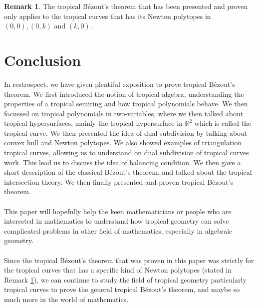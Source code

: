 \documentclass[]{article}
\theoremstyle{definition}
\numberwithin{equation}{section}
\newtheorem{rmk}[thm]{Remark}
\renewcommand{\.}{\,.}
\begin{document}
\begin{rmk} \label{fast}The tropical B\'ezout's theorem that has been presented and proven only applies to the tropical curves that has its Newton polytopes in $(0,0), (0,k)$ and $(k,0)$.\end{rmk}
\newpage

\section{Conclusion}
\hspace{3mm} In restrospect, we have given plentiful exposition to prove tropical B\'ezout's theorem. We first introduced the notion of tropical algebra, understanding the properties of a tropical semiring and how tropical polynomials behave. We then focussed on tropical polynomials in two-variables, where we then talked about tropical hypersurfaces, mainly the tropical hypersurface in $\mathbb{R}^2$ which is called the tropical curve. We then presented the idea of dual subdivision by talking about convex hull and Newton polytopes. We also showed examples of triangulation tropical curves, allowing us to understand on dual subdivision of tropical curves work. This lead us to discuss the idea of balancing condition. We then gave a short description of the classical B\'ezout's theorem, and talked about the tropical intersection theory. We then finally presented and proven tropical B\'ezout's theorem. \\ \\
\hspace*{3mm} This paper will hopefully help the keen mathematicians or people who are interested in mathematics to understand how tropical geometry can solve complicated problems in other field of mathematics, especially in algebraic geometry. \\ \\
\hspace*{3mm} Since the tropical B\'ezout's theorem that was proven in this paper was strictly for the tropical curves that has a specific kind of Newton polytopes (stated in Remark \ref{fast}), we can continue to study the field of tropical geometry particularly tropical curves to prove the general tropical B\'ezout's theorem, and maybe so much more in the world of mathematics. 
\newpage
\end{document}
